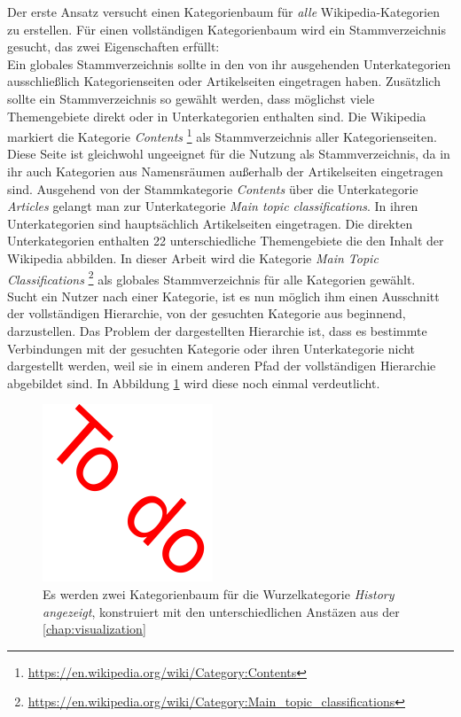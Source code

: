 
Der erste Ansatz versucht einen Kategorienbaum für \emph{alle} Wikipedia-Kategorien zu erstellen.
Für einen vollständigen Kategorienbaum wird ein Stammverzeichnis gesucht, das zwei Eigenschaften erfüllt:\\
Ein globales Stammverzeichnis sollte in den von ihr ausgehenden Unterkategorien ausschließlich Kategorienseiten oder Artikelseiten eingetragen haben.
Zusätzlich sollte ein Stammverzeichnis so gewählt werden, dass möglichst viele Themengebiete direkt oder in Unterkategorien enthalten sind.
Die Wikipedia markiert die Kategorie \emph{Contents} \footnote{\url{https://en.wikipedia.org/wiki/Category:Contents}} als Stammverzeichnis aller Kategorienseiten.
Diese Seite ist gleichwohl ungeeignet für die Nutzung als Stammverzeichnis, da in ihr auch Kategorien aus Namensräumen außerhalb der Artikelseiten eingetragen sind.
Ausgehend von der Stammkategorie \emph{Contents} über die Unterkategorie \emph{Articles}  gelangt man zur Unterkategorie \emph{Main topic classifications}.
In ihren Unterkategorien sind hauptsächlich Artikelseiten eingetragen. 
Die direkten Unterkategorien enthalten 22 unterschiedliche Themengebiete die den Inhalt der Wikipedia abbilden.
In dieser Arbeit wird die Kategorie \emph{Main Topic Classifications} \footnote{\url{https://en.wikipedia.org/wiki/Category:Main_topic_classifications}} als globales Stammverzeichnis für alle Kategorien gewählt.\\

Sucht ein Nutzer nach einer Kategorie, ist es nun möglich ihm einen Ausschnitt der vollständigen Hierarchie, von der gesuchten Kategorie aus beginnend, darzustellen.
Das Problem der dargestellten Hierarchie ist, dass es bestimmte Verbindungen mit der gesuchten Kategorie oder ihren Unterkategorie nicht dargestellt werden, weil sie in einem anderen Pfad der vollständigen Hierarchie abgebildet sind.
In Abbildung \ref{fig:two-trees} wird diese noch einmal verdeutlicht.

\begin{figure}
    \centering
    \includegraphics{images/todobild.pdf}
    \caption{Es werden zwei Kategorienbaum für die Wurzelkategorie \emph{History angezeigt}, konstruiert mit den unterschiedlichen Anstäzen aus der \ref{chap:visualization}}
    \label{fig:two-trees}
\end{figure}


